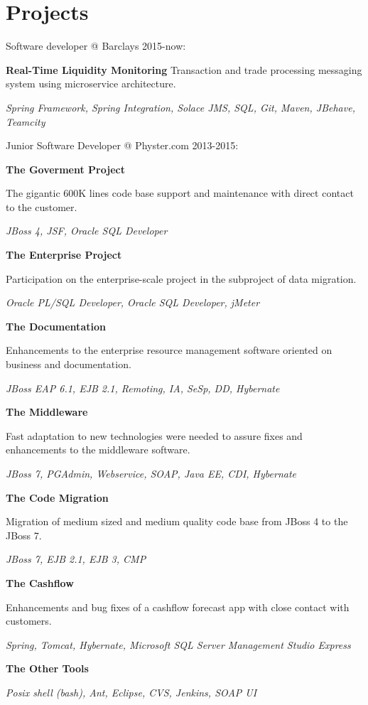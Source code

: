 \section{Projects}	
\bigskip


Software developer @ Barclays 2015-now:\par
\bigskip

\textbf{Real-Time Liquidity Monitoring}
Transaction and trade processing messaging system using microservice architecture.\par
\textit{Spring Framework, Spring Integration, Solace JMS, SQL, Git, Maven, JBehave, Teamcity} \par
\bigskip


Junior Software Developer @ Physter.com 2013-2015:\par
\bigskip

\textbf{The Goverment Project}\par
The gigantic 600K lines code base support and maintenance with direct contact to the customer.\par
\textit{JBoss 4, JSF, Oracle SQL Developer} \par
\bigskip

\textbf{The Enterprise Project}\par
Participation on the enterprise-scale project in the subproject of data migration.\par
\textit{Oracle PL/SQL Developer, Oracle SQL Developer, jMeter} \par
\bigskip

\textbf{The Documentation}\par
Enhancements to the enterprise resource management software oriented on business and documentation. \par
\textit{JBoss EAP 6.1, EJB 2.1, Remoting, IA, SeSp, DD, Hybernate} \par
\bigskip

\textbf{The Middleware}\par
Fast adaptation to new technologies were needed to assure fixes and enhancements to the middleware software. \par
\textit{JBoss 7, PGAdmin, Webservice, SOAP, Java EE, CDI, Hybernate} \par
\bigskip

\textbf{The Code Migration}\par
Migration of medium sized and medium quality code base from JBoss 4 to the JBoss 7.\par
\textit{JBoss 7, EJB 2.1, EJB 3, CMP}\par
\bigskip

\textbf{The Cashflow}\par
Enhancements and bug fixes of a cashflow forecast app with close contact with customers.\par
\textit{Spring, Tomcat, Hybernate, Microsoft SQL Server Management Studio Express}\par
\bigskip

\textbf{The Other Tools}\par
\textit{Posix shell (bash), Ant, Eclipse, CVS, Jenkins, SOAP UI}\par

